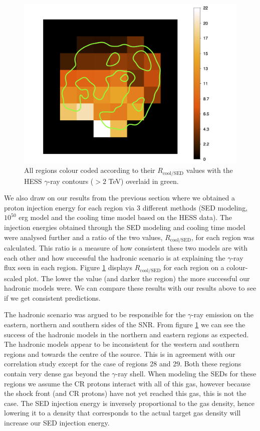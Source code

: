 \documentclass[12pt,a4paper]{article}
\begin{document}
\begin{figure}[H]
	\centering
	\includegraphics[width=.60\linewidth, height=0.27\textheight]{Wp_ratio_map}
	\caption{All regions colour coded according to their $R_{\mathrm{cool/SED}}$ values with the HESS $\gamma$-ray contours ($> 2$ TeV) overlaid in green.}
	\label{fig:wpratiocolourmap}
\end{figure}

We also draw on our results from the previous section where we obtained a proton injection energy for each region via 3 different methods (SED modeling, $10^{50}$ erg model and the cooling time model based on the HESS data). The injection energies obtained through the SED modeling and cooling time model were analysed further and a ratio of the two values, $R_{\mathrm{cool/SED}}$, for each region was calculated. This ratio is a measure of how consistent these two models are with each other and how successful the hadronic scenario is at explaining the $\gamma$-ray flux seen in each region. Figure \ref{fig:wpratiocolourmap} displays $R_{\mathrm{cool/SED}}$ for each region on a colour-scaled plot. The lower the value (and darker the region) the more successful our hadronic models were. We can compare these results with our results above to see if we get consistent predictions. 

The hadronic scenario was argued to be responsible for the $\gamma$-ray emission on the eastern, northern and southern sides of the SNR. From figure \ref{fig:wpratiocolourmap} we can see the success of the hadronic models in the northern and eastern regions as expected. The hadronic models appear to be inconsistent for the western and southern regions and towards the centre of the source. This is in agreement with our correlation study except for the case of regions 28 and 29. Both these regions contain very dense gas beyond the $\gamma$-ray shell. When modeling the SEDs for these regions we assume the CR protons interact with all of this gas, however because the shock front (and CR protons) have not yet reached this gas, this is not the case. The SED injection energy is inversely proportional to the gas density, hence lowering it to a density that corresponds to the actual target gas density will increase our SED injection energy. 
\end{document}

